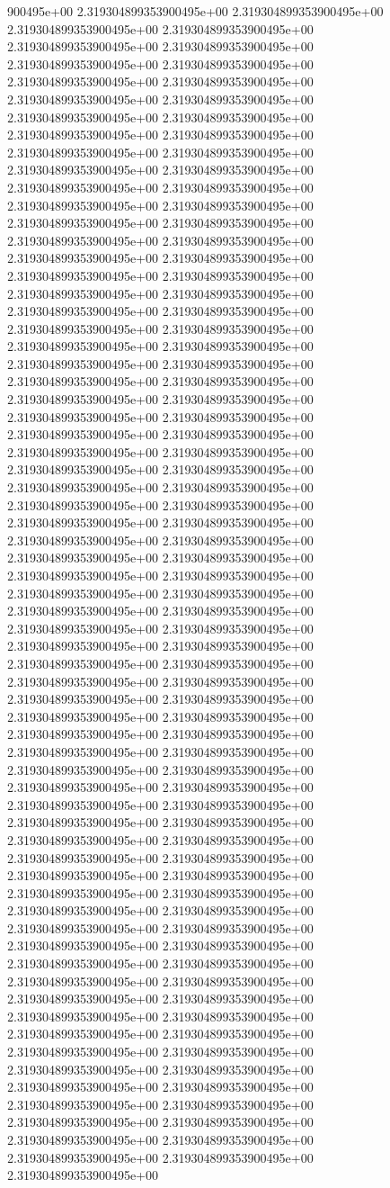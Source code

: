 900495e+00	2.319304899353900495e+00	2.319304899353900495e+00	2.319304899353900495e+00	2.319304899353900495e+00	2.319304899353900495e+00	2.319304899353900495e+00	2.319304899353900495e+00	2.319304899353900495e+00	2.319304899353900495e+00	2.319304899353900495e+00	2.319304899353900495e+00	2.319304899353900495e+00	2.319304899353900495e+00	2.319304899353900495e+00	2.319304899353900495e+00	2.319304899353900495e+00	2.319304899353900495e+00	2.319304899353900495e+00	2.319304899353900495e+00	2.319304899353900495e+00	2.319304899353900495e+00	2.319304899353900495e+00	2.319304899353900495e+00	2.319304899353900495e+00	2.319304899353900495e+00	2.319304899353900495e+00	2.319304899353900495e+00	2.319304899353900495e+00	2.319304899353900495e+00	2.319304899353900495e+00	2.319304899353900495e+00	2.319304899353900495e+00	2.319304899353900495e+00	2.319304899353900495e+00	2.319304899353900495e+00	2.319304899353900495e+00	2.319304899353900495e+00	2.319304899353900495e+00	2.319304899353900495e+00	2.319304899353900495e+00	2.319304899353900495e+00	2.319304899353900495e+00	2.319304899353900495e+00	2.319304899353900495e+00	2.319304899353900495e+00	2.319304899353900495e+00	2.319304899353900495e+00	2.319304899353900495e+00	2.319304899353900495e+00	2.319304899353900495e+00	2.319304899353900495e+00	2.319304899353900495e+00	2.319304899353900495e+00	2.319304899353900495e+00	2.319304899353900495e+00	2.319304899353900495e+00	2.319304899353900495e+00	2.319304899353900495e+00	2.319304899353900495e+00	2.319304899353900495e+00	2.319304899353900495e+00	2.319304899353900495e+00	2.319304899353900495e+00	2.319304899353900495e+00	2.319304899353900495e+00	2.319304899353900495e+00	2.319304899353900495e+00	2.319304899353900495e+00	2.319304899353900495e+00	2.319304899353900495e+00	2.319304899353900495e+00	2.319304899353900495e+00	2.319304899353900495e+00	2.319304899353900495e+00	2.319304899353900495e+00	2.319304899353900495e+00	2.319304899353900495e+00	2.319304899353900495e+00	2.319304899353900495e+00	2.319304899353900495e+00	2.319304899353900495e+00	2.319304899353900495e+00	2.319304899353900495e+00	2.319304899353900495e+00	2.319304899353900495e+00	2.319304899353900495e+00	2.319304899353900495e+00	2.319304899353900495e+00	2.319304899353900495e+00	2.319304899353900495e+00	2.319304899353900495e+00	2.319304899353900495e+00	2.319304899353900495e+00	2.319304899353900495e+00	2.319304899353900495e+00	2.319304899353900495e+00	2.319304899353900495e+00	2.319304899353900495e+00	2.319304899353900495e+00	2.319304899353900495e+00	2.319304899353900495e+00	2.319304899353900495e+00	2.319304899353900495e+00	2.319304899353900495e+00	2.319304899353900495e+00	2.319304899353900495e+00	2.319304899353900495e+00	2.319304899353900495e+00	2.319304899353900495e+00	2.319304899353900495e+00	2.319304899353900495e+00	2.319304899353900495e+00	2.319304899353900495e+00	2.319304899353900495e+00	2.319304899353900495e+00	2.319304899353900495e+00	2.319304899353900495e+00	2.319304899353900495e+00	2.319304899353900495e+00	2.319304899353900495e+00	2.319304899353900495e+00	2.319304899353900495e+00	2.319304899353900495e+00	2.319304899353900495e+00	2.319304899353900495e+00	2.319304899353900495e+00	2.319304899353900495e+00	2.319304899353900495e+00	2.319304899353900495e+00	2.319304899353900495e+00	2.319304899353900495e+00	2.319304899353900495e+00	2.319304899353900495e+00	